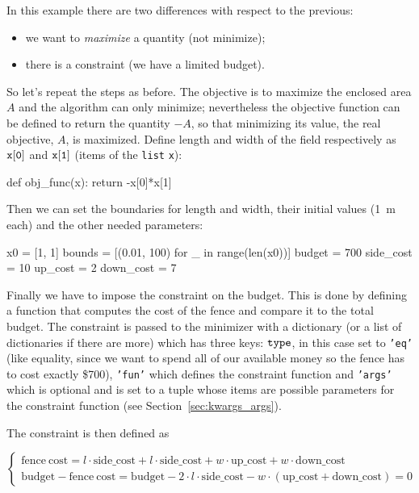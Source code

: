 In this example there are two differences with respect to the previous:

\begin{itemize}
\tightlist
\item
  we want to \emph{maximize} a quantity (not minimize);
\item
  there is a constraint (we have a limited budget).
\end{itemize}

So let's repeat the steps as before. The objective is to maximize the
enclosed area \(A\) and the algorithm can only minimize; nevertheless the objective function can be defined 
to return the quantity \(-A\), so that minimizing its value, the real objective, $A$, is maximized. 
Define length and width of the field respectively as \(\tt{x[0]}\) and \(\tt{x[1]}\) (items of the \texttt{list} \texttt{x}):

\begin{ipython}
def obj_func(x):
    return -x[0]*x[1]
\end{ipython}
Then we can set the boundaries for length and width, their initial values (1~m each) and the other needed parameters:

\begin{ipython}
x0 = [1, 1]
bounds = [(0.01, 100) for _ in range(len(x0))]
budget = 700
side_cost = 10
up_cost = 2
down_cost = 7

\end{ipython}

Finally we have to impose the constraint on the budget. This is done by defining a function that computes the cost of the fence and compare it to the total budget. 
The constraint is passed to the minimizer with a dictionary (or a list  of dictionaries if there are more) which has three keys: \(\tt{type}\), in this case set to \texttt{'eq'} (like equality, since we want to spend all of our available money so the
fence has to cost exactly \$700), \texttt{'fun'} which defines the constraint function and \texttt{'args'} which is optional and is set to a tuple whose items are possible parameters for the constraint function (see Section~\ref{sec:kwargs_args}).

The constraint is then defined as

\begin{equation*}
\begin{cases}
\mathrm{fence~cost} = l\cdot\mathrm{side\_cost} + l\cdot\mathrm{side\_cost} + w\cdot\mathrm{up\_cost} + w\cdot\mathrm{down\_cost}\\
\mathrm{budget} - \mathrm{fence~cost} = \mathrm{budget} - 2\cdot l\cdot\mathrm{side\_cost} - w\cdot(\mathrm{up\_cost} + \mathrm{down\_cost}) = 0
\end{cases}
\end{equation*}

